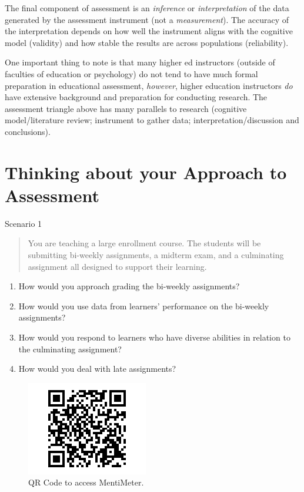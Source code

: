 \documentclass[
]{book}
\providecommand{\tightlist}{%
  \setlength{\itemsep}{0pt}\setlength{\parskip}{0pt}}
\begin{document}
The final component of assessment is an \emph{inference} or \emph{interpretation} of the data generated by the assessment instrument (not a \emph{measurement}). The accuracy of the interpretation depends on how well the instrument aligns with the cognitive model (validity) and how stable the results are across populations (reliability).

\begin{reflect}
One important thing to note is that many higher ed instructors (outside
of faculties of education or psychology) do not tend to have much formal
preparation in educational assessment, \emph{however}, higher education
instructors \emph{do} have extensive background and preparation for
conducting research. The assessment triangle above has many parallels to
research (cognitive model/literature review; instrument to gather data;
interpretation/discussion and conclusions).
\end{reflect}

\hypertarget{thinking-about-your-approach-to-assessment}{%
\section{Thinking about your Approach to Assessment}\label{thinking-about-your-approach-to-assessment}}

Scenario 1

\begin{quote}
You are teaching a large enrollment course. The students will be submitting bi-weekly assignments, a midterm exam, and a culminating assignment all designed to support their learning.
\end{quote}

\begin{enumerate}
\def\labelenumi{\arabic{enumi}.}
\tightlist
\item
  How would you approach grading the bi-weekly assignments?\\
\item
  How would you use data from learners' performance on the bi-weekly assignments?\\
\item
  How would you respond to learners who have diverse abilities in relation to the culminating assignment?\\
\item
  How would you deal with late assignments?
\end{enumerate}

\begin{figure}
\centering
\includegraphics{assets/twu-asmt/scenario1.png}
\caption{QR Code to access MentiMeter.}
\end{figure}
\end{document}
